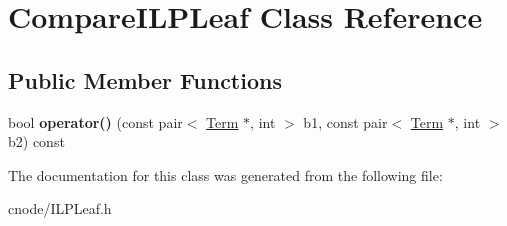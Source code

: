 \hypertarget{classCompareILPLeaf}{\section{\-Compare\-I\-L\-P\-Leaf \-Class \-Reference}
\label{classCompareILPLeaf}
}
\subsection*{\-Public \-Member \-Functions}
\begin{DoxyCompactItemize}
\item 
\hypertarget{classCompareILPLeaf_ae16fed8ad4d1199922763068ff9504d5}{bool {\bfseries operator()} (const pair$<$ \hyperlink{classTerm}{\-Term} $\ast$, int $>$ b1, const pair$<$ \hyperlink{classTerm}{\-Term} $\ast$, int $>$ b2) const }\label{classCompareILPLeaf_ae16fed8ad4d1199922763068ff9504d5}

\end{DoxyCompactItemize}


\-The documentation for this class was generated from the following file\-:\begin{DoxyCompactItemize}
\item 
cnode/\-I\-L\-P\-Leaf.\-h\end{DoxyCompactItemize}
